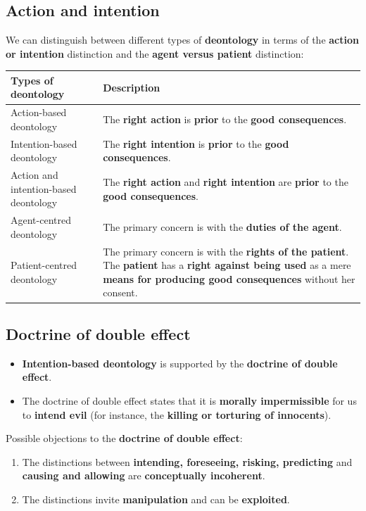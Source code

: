\documentclass[11pt]{article}
\begin{document}
\subsection{Action and intention}
\label{sec:org2b92be8}
We can distinguish between different types of \textbf{deontology} in terms of the \textbf{action or intention} distinction and the \textbf{agent versus patient} distinction:

\begin{center}
\begin{tabularx}{\textwidth}{|X|X|}
\hline
Types of deontology & Description\\
\hline
Action-based deontology & The \textbf{right action} is \textbf{prior} to the \textbf{good consequences}.\\
\hline
Intention-based deontology & The \textbf{right intention} is \textbf{prior} to the \textbf{good consequences}.\\
\hline
Action and intention-based deontology & The \textbf{right action} and \textbf{right intention} are \textbf{prior} to the \textbf{good consequences}.\\
\hline
Agent-centred deontology & The primary concern is with the \textbf{duties of the agent}.\\
\hline
Patient-centred deontology & The primary concern is with the \textbf{rights of the patient}. The \textbf{patient} has a \textbf{right against being used} as a mere \textbf{means for producing good consequences} without her consent.\\
\hline
\end{tabularx}
\end{center}
\subsection{Doctrine of double effect}
\label{sec:org61a45da}
\begin{itemize}
\item \textbf{Intention-based deontology} is supported by the \textbf{doctrine of double effect}.
\item The doctrine of double effect states that it is \textbf{morally impermissible} for us to \textbf{intend evil} (for instance, the \textbf{killing or torturing of innocents}).
\end{itemize}

Possible objections to the \textbf{doctrine of double effect}:
\begin{enumerate}
\item The distinctions between \textbf{intending, foreseeing, risking, predicting} and \textbf{causing and allowing} are \textbf{conceptually incoherent}.
\item The distinctions invite \textbf{manipulation} and can be \textbf{exploited}.
\end{enumerate}
\end{document}
